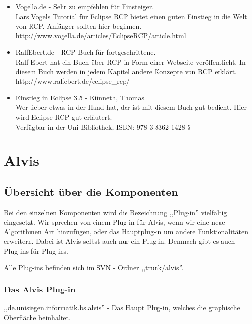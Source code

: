 \documentclass[10pt,a4paper]{article}
\begin{document}
\begin{itemize}
\item Vogella.de - Sehr zu empfehlen für Einsteiger. \\
Lars Vogels Tutorial für Eclipse RCP bietet einen guten Einstieg in die Welt von RCP. Anfänger sollten hier beginnen.\\
http://www.vogella.de/articles/EclipseRCP/article.html
\item RalfEbert.de - RCP Buch für fortgeschrittene. \\
Ralf Ebert hat ein Buch über RCP in Form einer Webseite veröffentlicht. In diesem Buch werden in jedem Kapitel andere Konzepte von RCP erklärt. \\
http://www.ralfebert.de/eclipse\_rcp/
\item Einstieg in Eclipse 3.5 - Künneth, Thomas \\
Wer lieber etwas in der Hand hat, der ist mit diesem Buch gut bedient. Hier wird Eclipse RCP gut erläutert. \\
Verfügbar in der Uni-Bibliothek, ISBN: 978-3-8362-1428-5
\end{itemize}



\newpage
\section{Alvis}
\subsection{Übersicht über die Komponenten}
Bei den einzelnen Komponenten wird die Bezeichnung ,,Plug-in'' vielfältig eingesetzt. Wir sprechen von einem Plug-in für Alvis, wenn wir eine neue Algorithmen Art hinzufügen, oder das Hauptplug-in um andere Funktionalitäten erweitern. Dabei ist Alvis selbst auch nur ein Plug-in. Demnach gibt es auch Plug-ins für Plug-ins.

Alle Plug-ins befinden sich im SVN - Ordner ,,trunk/alvis''.
\subsubsection{Das Alvis Plug-in}
,,de.unisiegen.informatik.bs.alvis'' - Das Haupt Plug-in, welches die graphische Oberfläche beinhaltet.
\end{document}
